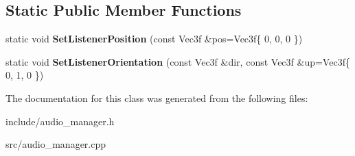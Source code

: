 \subsection*{Static Public Member Functions}
\begin{DoxyCompactItemize}
\item 
\mbox{\label{class_blade_1_1_audio_manager_aba33e3e3cabd2a49170f1937f9b70a37}} 
static void {\bfseries Set\+Listener\+Position} (const Vec3f \&pos=Vec3f\{ 0, 0, 0 \})
\item 
\mbox{\label{class_blade_1_1_audio_manager_a549b33f8f8d41a1c6d92cfe0c6c5a284}} 
static void {\bfseries Set\+Listener\+Orientation} (const Vec3f \&dir, const Vec3f \&up=Vec3f\{ 0, 1, 0 \})
\end{DoxyCompactItemize}


The documentation for this class was generated from the following files\+:\begin{DoxyCompactItemize}
\item 
include/audio\+\_\+manager.\+h\item 
src/audio\+\_\+manager.\+cpp\end{DoxyCompactItemize}
